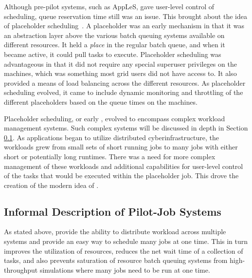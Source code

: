 \documentclass{sig-alternate}
\begin{document}
Although pre-pilot systems, such as AppLeS, gave user-level control of scheduling, queue reservation time still was an issue. This brought about the idea of placeholder scheduling~\cite{Pinchak02practicalheterogeneous, Singh:2008:WTC:1341811.1341822}. A placeholder was an early \pilot mechanism in that it was an abstraction layer above the various batch queuing systems available on different resources. It held a \textit{place} in the regular batch queue, and when it became active, it could pull tasks to execute.
Placeholder scheduling was advantageous in that it did not require any special superuser privileges on the machines, which was something most grid users did not have access to. It also provided a means of load balancing across the different resources. As placeholder scheduling evolved, it came to include dynamic monitoring and throttling of the different placeholders based on the queue times on the machines.

Placeholder scheduling, or early \pilots, evolved to encompass complex workload management systems. Such complex systems will be discussed in depth in Section \ref{sec:pj}. As applications began to utilize distributed cyberinfrastructure, the workloads grew from small sets of short running jobs to many jobs with either short or potentially long runtimes. There was a need for more complex management of these workloads and additional capabilities for user-level control of the tasks that would be executed within the placeholder job. This drove the creation of the modern idea of \pilots. 
 

\subsection{Informal Description of Pilot-Job Systems}
\label{sec:pj}


As stated above, \pilotjobs provide the ability to 
distribute workload across multiple systems and
provide an easy way to schedule many jobs at one time. This in turn
improves the utilization of resources, reduces the net wait time of a
collection of tasks, and also prevents saturation of resource batch
queuing systems from high-throughput simulations where many jobs
need to be run at one time.
\end{document}
